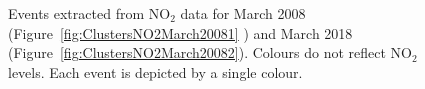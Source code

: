 \documentclass[a4paper,11pt]{article}
\begin{document}
\begin{figure}[!hb]
	\centering
	\caption{Events extracted from $\text{NO}_2$ data for March 2008 (Figure~\ref{fig:ClustersNO2March20081} ) and March 2018 (Figure~\ref{fig:ClustersNO2March20082}). Colours do not reflect $\text{NO}_2$ levels. Each event is depicted by a single colour.}
	\label{fig:ClustersNO2March2008}
\end{figure}

\end{document}
